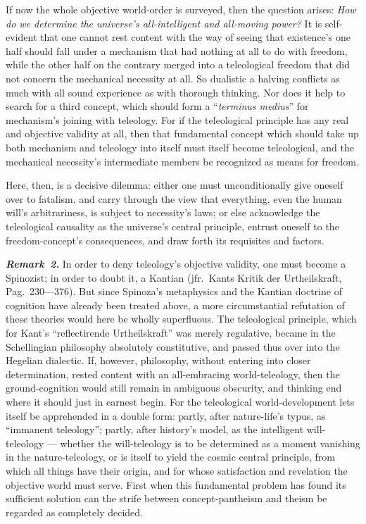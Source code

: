 \documentclass[12pt]{book}
\newcommand{\anm}[1]{\emph{\textbf{Remark~#1.}}}
\begin{document}
If now the whole objective world-order is surveyed, then the question
arises: \emph{How do we determine the universe's all-intelligent and
all-moving power?} It is self-evident that one cannot rest content with the
way of seeing that existence's one half should fall under a mechanism that
had nothing at all to do with freedom, while the other half on the contrary
merged into a teleological freedom that did not concern the mechanical
necessity at all. So dualistic a halving conflicts as much with all sound
experience as with thorough thinking. Nor does it help to search for a third
concept, which should form a ``\textit{terminus medius}'' for mechanism's
joining with teleology. For if the teleological principle has any real and
objective validity at all, then that fundamental concept which should take
up both mechanism and teleology into itself must itself become teleological,
and the mechanical necessity's intermediate members be recognized as means
for freedom.

Here, then, is a decisive dilemma: either one must unconditionally give
oneself over to fatalism, and carry through the view that everything, even
the human will's arbitrariness, is subject to necessity's laws; or else
acknowledge the teleological causality as the universe's central principle,
entrust oneself to the freedom-concept's consequences, and draw forth its
requisites and factors.

\anm{2} In order to deny teleology's objective validity, one must become a
Spinozist; in order to doubt it, a Kantian (jfr.\ Kants Kritik der
Urtheilskraft, Pag.\ 230---376). But since Spinoza's metaphysics and the
Kantian doctrine of cognition have already been treated above, a more
circumstantial refutation of these theories would here be wholly
superfluous. The teleological principle, which for Kant's ``reflectirende
Urtheilskraft'' was merely regulative, became in the Schellingian philosophy
absolutely constitutive, and passed thus over into the Hegelian dialectic.
If, however, philosophy, without entering into closer determination, rested
content with an all-embracing world-teleology, then the ground-cognition
would still remain in ambiguous obscurity, and thinking end where it should
just in earnest begin. For the teleological world-development lets itself be
apprehended in a double form: partly, after nature-life's typus, as
``immanent teleology''; partly, after history's model, as the intelligent
will-teleology --- whether the will-teleology is to be determined as a
moment vanishing in the nature-teleology, or is itself to yield the cosmic
central principle, from which all things have their origin, and for whose
satisfaction and revelation the objective world must serve. First when this
fundamental problem has found its sufficient solution can the strife between
concept-pantheism and theism be regarded as completely decided.
\end{document}
